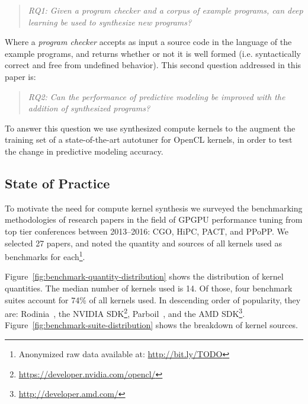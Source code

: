 \documentclass[preprint,nonatbib,10pt,nocopyrightspace]{sigplanconf}
\begin{document}
\begin{quote}
  \emph{RQ1: Given a program checker and a corpus of example programs,
    can deep learning be used to synthesize new programs?}
\end{quote}

\noindent
Where a \emph{program checker} accepts as input a source code in the
language of the example programs, and returns whether or not it is
well formed (i.e. syntactically correct and free from undefined
behavior). This second question addressed in this paper is:

\begin{quote}
  \emph{RQ2: Can the performance of predictive modeling be improved
    with the addition of synthesized programs?}
\end{quote}

\noindent
To answer this question we use synthesized compute kernels to the
augment the training set of a state-of-the-art autotuner for OpenCL
kernels, in order to test the change in predictive modeling accuracy.




\subsection{State of Practice}

To motivate the need for compute kernel synthesis we surveyed the
benchmarking methodologies of research papers in the field of GPGPU
performance tuning from top tier conferences between 2013--2016: CGO,
HiPC, PACT, and PPoPP. We selected 27 papers, and noted the quantity
and sources of all kernels used as benchmarks for
each\footnote{Anonymized raw data available at:
  \url{http://bit.ly/TODO}}.

Figure~\ref{fig:benchmark-quantity-distribution} shows the
distribution of kernel quantities. The median number of kernels used
is 14. Of those, four benchmark suites account for 74\% of all kernels
used. In descending order of popularity, they are:
Rodinia~\cite{Che2009}, the NVIDIA
SDK\footnote{\url{https://developer.nvidia.com/opencl/}},
Parboil~\cite{Stratton2012}, and the AMD
SDK\footnote{\url{http://developer.amd.com/}}. Figure~\ref{fig:benchmark-suite-distribution}
shows the breakdown of kernel sources.
\end{document}
